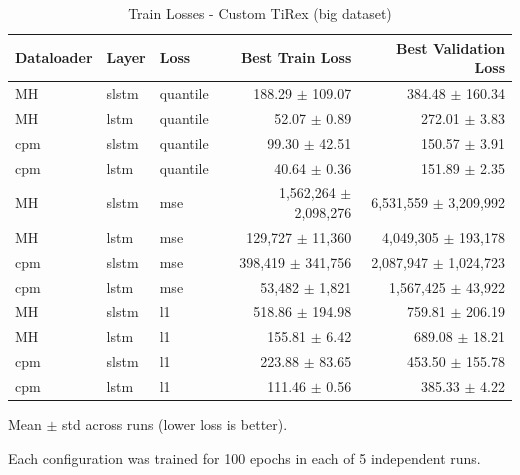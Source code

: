 \documentclass[a4paper,oneside,10pt,ngerman,english]{scrartcl}
\begin{document}
\begin{table}[htbp]
	\centering
	\begin{threeparttable}
		\caption{Train Losses - Custom TiRex (big dataset)}
		\label{tab:losses_custom_tirex_full}
		\setlength{\tabcolsep}{3pt}
		\begin{tabular}{lllrr}
			\toprule
			\textbf{Dataloader} & \textbf{Layer} & \textbf{Loss} & \textbf{Best Train Loss} & \textbf{Best Validation Loss}\\
			\midrule
			MH & slstm & quantile  & 188.29 $\pm$ 109.07 & 384.48 $\pm$ 160.34 \\
			MH & lstm  & quantile  & 52.07 $\pm$ 0.89 & 272.01 $\pm$ 3.83 \\
			cpm & slstm    & quantile  & 99.30 $\pm$ 42.51 & \cellcolor[HTML]{006837}\color[HTML]{f1f1f1}150.57 $\pm$ 3.91 \\
			cpm & lstm     & quantile  & \cellcolor[HTML]{006837}\color[HTML]{f1f1f1}40.64 $\pm$ 0.36 & 151.89 $\pm$ 2.35 \\
			\midrule
			MH & slstm & mse       & 1,562,264 $\pm$ 2,098,276 & 6,531,559 $\pm$ 3,209,992 \\
			MH & lstm  & mse       & 129,727 $\pm$ 11,360 & 4,049,305 $\pm$ 193,178  \\
			cpm & slstm    & mse       & 398,419 $\pm$ 341,756 & 2,087,947 $\pm$ 1,024,723  \\
			cpm & lstm      & mse      & \cellcolor[HTML]{006837}\color[HTML]{f1f1f1}53,482 $\pm$ 1,821 & \cellcolor[HTML]{006837}\color[HTML]{f1f1f1}1,567,425 $\pm$ 43,922 \\
			\midrule
			MH & slstm & l1        & 518.86 $\pm$ 194.98 & 759.81 $\pm$ 206.19  \\
			MH & lstm  & l1        & 155.81 $\pm$ 6.42 & 689.08 $\pm$ 18.21  \\
			cpm & slstm    & l1        & 223.88 $\pm$ 83.65 & 453.50 $\pm$ 155.78 \\
			cpm & lstm     & l1        & \cellcolor[HTML]{006837}\color[HTML]{f1f1f1}111.46 $\pm$ 0.56 & \cellcolor[HTML]{006837}\color[HTML]{f1f1f1}385.33 $\pm$ 4.22	 \\
			\bottomrule
		\end{tabular}
		\begin{tablenotes}
			\small
			\item[a] Mean $\pm$ std across runs (lower loss is better).
			\item[b] Each configuration was trained for 100 epochs in each of 5 independent runs.
		\end{tablenotes}
	\end{threeparttable}		
\end{table}
\end{document}
